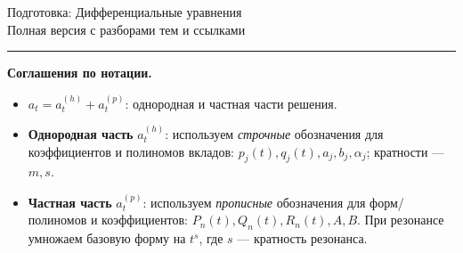 \documentclass[11pt,a4paper]{article}
\newcommand{\topicsBase}{preparation/topics}
\begin{document}
\begin{center}
  {\Huge Подготовка: Дифференциальные уравнения}\\[0.4cm]
  {\large Полная версия с разборами тем и ссылками}\\[0.2cm]
  \rule{\textwidth}{0.6pt}
\end{center}

\vspace{0.4cm}
\noindent\textbf{Соглашения по нотации.}
\begin{itemize}
  \item \(a_t = a_t^{(h)} + a_t^{(p)}\): однородная и частная части решения.
  \item \textbf{Однородная часть} \(a_t^{(h)}\):
  используем \emph{строчные} обозначения для коэффициентов и полиномов вкладов:
  \(p_j(t), q_j(t), a_j, b_j, \alpha_j\); кратности — \(m, s\).
  \item \textbf{Частная часть} \(a_t^{(p)}\):
  используем \emph{прописные} обозначения для форм/полиномов и коэффициентов:
  \(P_n(t), Q_n(t), R_n(t), A, B\). При резонансе умножаем базовую форму на \(t^{s}\), где \(s\) — кратность резонанса.
\end{itemize}

\vspace{1cm}

{
	\hypersetup{linkcolor=black}
	\tableofcontents
}

\newpage



% 
% 
\end{document}
